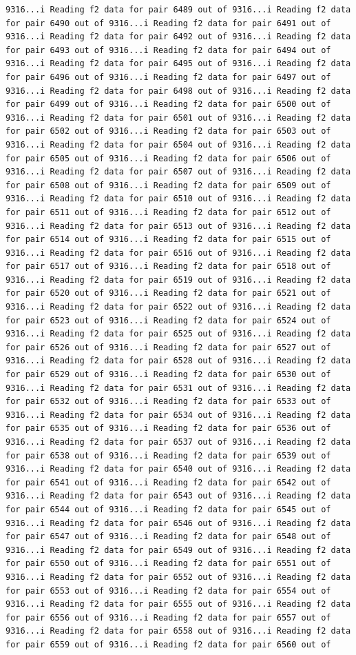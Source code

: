 \documentclass[
]{article}
\begin{document}
\begin{verbatim}
9316...i Reading f2 data for pair 6489 out of 9316...i Reading f2 data for pair 6490 out of 9316...i Reading f2 data for pair 6491 out of 9316...i Reading f2 data for pair 6492 out of 9316...i Reading f2 data for pair 6493 out of 9316...i Reading f2 data for pair 6494 out of 9316...i Reading f2 data for pair 6495 out of 9316...i Reading f2 data for pair 6496 out of 9316...i Reading f2 data for pair 6497 out of 9316...i Reading f2 data for pair 6498 out of 9316...i Reading f2 data for pair 6499 out of 9316...i Reading f2 data for pair 6500 out of 9316...i Reading f2 data for pair 6501 out of 9316...i Reading f2 data for pair 6502 out of 9316...i Reading f2 data for pair 6503 out of 9316...i Reading f2 data for pair 6504 out of 9316...i Reading f2 data for pair 6505 out of 9316...i Reading f2 data for pair 6506 out of 9316...i Reading f2 data for pair 6507 out of 9316...i Reading f2 data for pair 6508 out of 9316...i Reading f2 data for pair 6509 out of 9316...i Reading f2 data for pair 6510 out of 9316...i Reading f2 data for pair 6511 out of 9316...i Reading f2 data for pair 6512 out of 9316...i Reading f2 data for pair 6513 out of 9316...i Reading f2 data for pair 6514 out of 9316...i Reading f2 data for pair 6515 out of 9316...i Reading f2 data for pair 6516 out of 9316...i Reading f2 data for pair 6517 out of 9316...i Reading f2 data for pair 6518 out of 9316...i Reading f2 data for pair 6519 out of 9316...i Reading f2 data for pair 6520 out of 9316...i Reading f2 data for pair 6521 out of 9316...i Reading f2 data for pair 6522 out of 9316...i Reading f2 data for pair 6523 out of 9316...i Reading f2 data for pair 6524 out of 9316...i Reading f2 data for pair 6525 out of 9316...i Reading f2 data for pair 6526 out of 9316...i Reading f2 data for pair 6527 out of 9316...i Reading f2 data for pair 6528 out of 9316...i Reading f2 data for pair 6529 out of 9316...i Reading f2 data for pair 6530 out of 9316...i Reading f2 data for pair 6531 out of 9316...i Reading f2 data for pair 6532 out of 9316...i Reading f2 data for pair 6533 out of 9316...i Reading f2 data for pair 6534 out of 9316...i Reading f2 data for pair 6535 out of 9316...i Reading f2 data for pair 6536 out of 9316...i Reading f2 data for pair 6537 out of 9316...i Reading f2 data for pair 6538 out of 9316...i Reading f2 data for pair 6539 out of 9316...i Reading f2 data for pair 6540 out of 9316...i Reading f2 data for pair 6541 out of 9316...i Reading f2 data for pair 6542 out of 9316...i Reading f2 data for pair 6543 out of 9316...i Reading f2 data for pair 6544 out of 9316...i Reading f2 data for pair 6545 out of 9316...i Reading f2 data for pair 6546 out of 9316...i Reading f2 data for pair 6547 out of 9316...i Reading f2 data for pair 6548 out of 9316...i Reading f2 data for pair 6549 out of 9316...i Reading f2 data for pair 6550 out of 9316...i Reading f2 data for pair 6551 out of 9316...i Reading f2 data for pair 6552 out of 9316...i Reading f2 data for pair 6553 out of 9316...i Reading f2 data for pair 6554 out of 9316...i Reading f2 data for pair 6555 out of 9316...i Reading f2 data for pair 6556 out of 9316...i Reading f2 data for pair 6557 out of 9316...i Reading f2 data for pair 6558 out of 9316...i Reading f2 data for pair 6559 out of 9316...i Reading f2 data for pair 6560 out of 
\end{verbatim}
\end{document}
